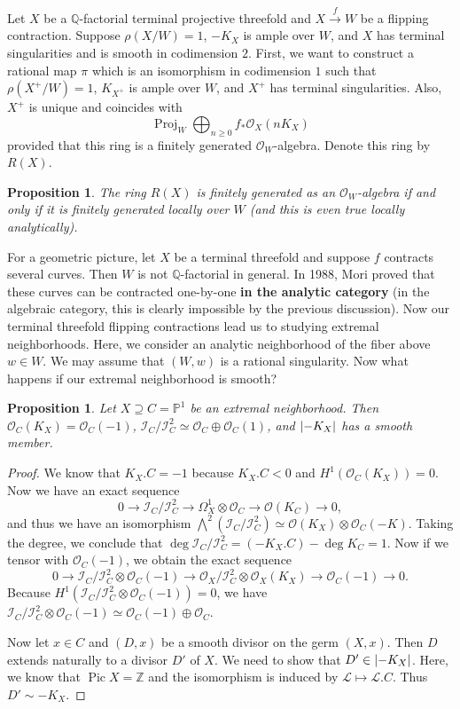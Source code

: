 \documentclass[leqno, openany]{memoir}
\newtheorem{prop}[thm]{Proposition}
\theoremstyle{definition}
\theoremstyle{remark}
\theoremstyle{plain}
\theoremstyle{definition}
\theoremstyle{remark}
\newcommand{\Z}{\mathbb{Z}}
\newcommand{\Q}{\mathbb{Q}}
\renewcommand{\P}{\mathbb{P}}
\newcommand{\mc}[1]{\mathcal{#1}}
\DeclareMathOperator{\Pic}{Pic}
\DeclareMathOperator{\Proj}{Proj}
\begin{document}
Let $X$ be a $\Q$-factorial terminal projective threefold and $X \xrightarrow{f} W$ be a flipping contraction. Suppose $\rho(X/W) = 1$, $-K_X$ is ample over $W$, and $X$ has terminal singularities and is smooth in codimension $2$. First, we want to construct a rational map $\pi$ which is an isomorphism in codimension $1$ such that $\rho(X^+/W) = 1$, $K_{X^+}$ is ample over $W$, and $X^+$ has terminal singularities. Also, $X^+$ is unique and coincides with
\[ \Proj_W \bigoplus_{n \geq 0} f_* \mc{O}_X(nK_X) \]
provided that this ring is a finitely generated $\mc{O}_W$-algebra. Denote this ring by $R(X)$.

\begin{prop}
    The ring $R(X)$ is finitely generated as an $\mc{O}_W$-algebra if and only if it is finitely generated locally over $W$ (and this is even true locally analytically).
\end{prop}

For a geometric picture, let $X$ be a terminal threefold and suppose $f$ contracts several curves. Then $W$ is not $\Q$-factorial in general. In 1988, Mori proved that these curves can be contracted one-by-one \textbf{in the analytic category} (in the algebraic category, this is clearly impossible by the previous discussion). Now our terminal threefold flipping contractions lead us to studying extremal neighborhoods. Here, we consider an analytic neighborhood of the fiber above $w \in W$. We may assume that $(W, w)$ is a rational singularity. Now what happens if our extremal neighborhood is smooth?

\begin{prop}
    Let $X \supseteq C = \P^1$ be an extremal neighborhood. Then $\mc{O}_C(K_X) = \mc{O}_C(-1)$, $\mc{I}_C / \mc{I}_C^2 \simeq \mc{O}_C \oplus \mc{O}_C(1)$, and $\abs{-K_X}$ has a smooth member.
\end{prop}

\begin{proof}
    We know that $K_X. C = -1$ because $K_X. C < 0$ and $H^1(\mc{O}_C(K_X)) = 0$. Now we have an exact sequence
    \[ 0 \to \mc{I}_C/\mc{I}_C^2 \to \Omega^1_X \otimes \mc{O}_C \to \mc{O}(K_C) \to 0, \]
    and thus we have an isomorphism $\bigwedge^2(\mc{I}_C/\mc{I}_C^2) \simeq \mc{O}(K_X) \otimes \mc{O}_C(-K)$. Taking the degree, we conclude that $\deg \mc{I}_C / \mc{I}_C^2 = (-K_X.C) - \deg K_C = 1$. Now if we tensor with $\mc{O}_C(-1)$, we obtain the exact sequence
    \[ 0 \to \mc{I}_C/\mc{I}_C^2 \otimes \mc{O}_C(-1) \to \mc{O}_X / \mc{I}_C^2 \otimes \mc{O}_X(K_X) \to \mc{O}_C(-1) \to 0. \]
    Because $H^1(\mc{I}_C / \mc{I}_C^2 \otimes \mc{O}_C(-1)) = 0$, we have $\mc{I}_C / \mc{I}_C^2 \otimes \mc{O}_C(-1) \simeq \mc{O}_C(-1) \oplus \mc{O}_C$.

    Now let $x \in C$ and $(D, x)$ be a smooth divisor on the germ $(X, x)$. Then $D$ extends naturally to a divisor $D'$ of $X$. We need to show that $D' \in \abs{-K_X}$. Here, we know that $\Pic X = \Z$ and the isomorphism is induced by $\mc{L} \mapsto \mc{L}.C$. Thus $D' \sim -K_X$.
\end{proof}
\end{document}
